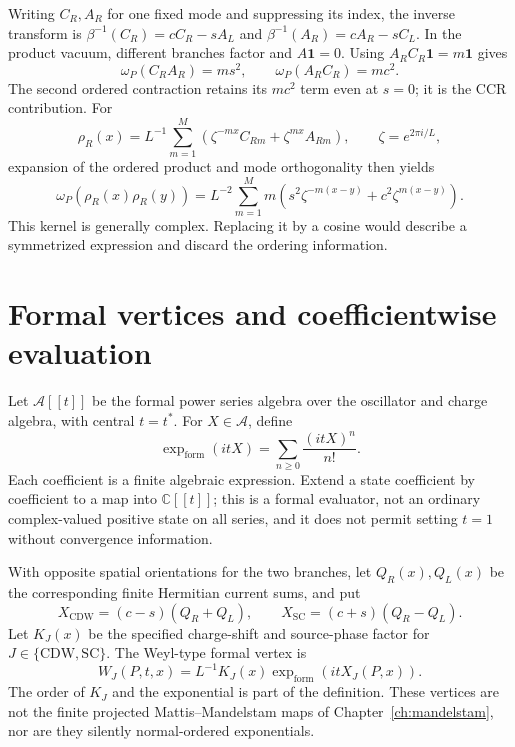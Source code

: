 Writing $C_R,A_R$ for one fixed mode and suppressing its index, the inverse
transform is $\beta^{-1}(C_R)=cC_R-sA_L$ and
$\beta^{-1}(A_R)=cA_R-sC_L$. In the product vacuum, different branches
factor and $A\mathbf1=0$. Using $A_RC_R\mathbf1=m\mathbf1$ gives
\begin{equation}
 \omega_P(C_RA_R)=ms^2,\qquad
 \omega_P(A_RC_R)=mc^2.
 \label{eq:a08-bare-contractions}
\end{equation}
The second ordered contraction retains its $mc^2$ term even at $s=0$; it is
the CCR contribution. For
\begin{equation}
 \rho_R(x)=L^{-1}\sum_{m=1}^M
   \left(\zeta^{-mx}C_{Rm}+\zeta^{mx}A_{Rm}\right),
 \qquad \zeta=e^{2\pi i/L},
\end{equation}
expansion of the ordered product and mode orthogonality then yields
\begin{equation}
 \omega_P(\rho_R(x)\rho_R(y))
 =L^{-2}\sum_{m=1}^M m\left(
   s^2\zeta^{-m(x-y)}+c^2\zeta^{m(x-y)}\right).
 \label{eq:a08-density-kernel}
\end{equation}
This kernel is generally complex. Replacing it by a cosine would describe a
symmetrized expression and discard the ordering information.

\section{Formal vertices and coefficientwise evaluation}

Let $\mathcal A[[t]]$ be the formal power series algebra over the oscillator
and charge algebra, with central $t=t^*$. For $X\in\mathcal A$, define
\begin{equation}
 \exp_{\mathrm{form}}(itX)=\sum_{n\geq0}\frac{(itX)^n}{n!}.
 \label{eq:a08-formal-exp}
\end{equation}
Each coefficient is a finite algebraic expression. Extend a state coefficient
by coefficient to a map into $\mathbb C[[t]]$; this is a formal evaluator,
not an ordinary complex-valued positive state on all series, and it does not
permit setting $t=1$ without convergence information.

With opposite spatial orientations for the two branches, let $Q_R(x),Q_L(x)$
be the corresponding finite Hermitian current sums, and put
\begin{equation}
 X_{\mathrm{CDW}}=(c-s)(Q_R+Q_L),\qquad
 X_{\mathrm{SC}}=(c+s)(Q_R-Q_L).
\end{equation}
Let $K_J(x)$ be the specified charge-shift and source-phase factor for
$J\in\{\mathrm{CDW},\mathrm{SC}\}$. The Weyl-type formal vertex is
\begin{equation}
 W_J(P,t,x)=L^{-1}K_J(x)
                 \exp_{\mathrm{form}}(itX_J(P,x)).
 \label{eq:a08-vertex}
\end{equation}
The order of $K_J$ and the exponential is part of the definition. These
vertices are not the finite projected Mattis--Mandelstam maps of
Chapter~\ref{ch:mandelstam}, nor are they silently normal-ordered
exponentials.

